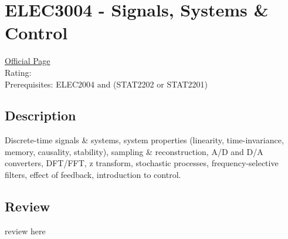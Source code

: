 \hypertarget{ELEC3004}{\section{ELEC3004 - Signals, Systems \& Control}}

\large
\textcolor{turbo_purple}{\href{https://my.uq.edu.au/programs-courses/course.html?course_code=ELEC3004}{Official Page}} \\
Rating: \cstar\cstar\cstar\cstar\ostar \\
Prerequisites: ELEC2004 and (STAT2202 or STAT2201)

\normalsize
\subsection*{Description}
Discrete-time signals \& systems, system properties (linearity, time-invariance, memory, causality, stability), sampling \& reconstruction, A/D and D/A converters, DFT/FFT, z transform, stochastic processes, frequency-selective filters, effect of feedback, introduction to control.

\subsection*{Review}
review here

